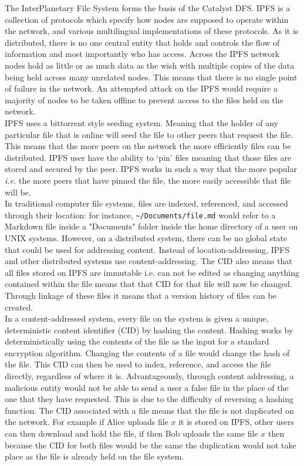 The InterPlanetary File System forms the basis of the Catalyst DFS. IPFS is a collection of protocols which specify how nodes are supposed to operate within the network, and various multilingual implementations of these protocols. As it is distributed, there is no one central entity that holds and controls the flow of information and most importantly who has access. Across the IPFS network nodes hold as little or as much data as the wish with multiple copies of the data being held across many unrelated nodes. This means that there is no single point of failure in the network. An attempted attack on the IPFS would require a majority of nodes to be taken offline to prevent access to the files held on the network.   \\

IPFS uses a bittorrent style seeding system. Meaning that the holder of any particular file that is online will seed the file to other peers that request the file. This means that the more peers on the network the more efficiently files can be distributed. IPFS user have the ability to `pin' files meaning that those files are stored and secured by the peer. IPFS works in such a way that the more popular \textit{i.e.} the more peers that have pinned the file, the more easily accessible that file will be.   \\

In traditional computer file systems, files are indexed, referenced, and accessed through their location: for instance, \verb`~/Documents/file.md` would refer to a Markdown file inside a "Documents" folder inside the home directory of a user on UNIX systems. However, on a distributed system, there can be no global state that could be used for addressing content. Instead of location-addressing, IPFS and other distributed systems use content-addressing. The CID also means that all files stored on IPFS are immutable i.e. can not be edited as changing anything contained within the file means that that CID for that file will now be changed. Through linkage of these files it means that a version history of files can be created. \\

In a content-addressed system, every file on the system is given a unique, deterministic content identifier (CID) by hashing the content. Hashing works by deterministically using the contents of the file as the input for a standard encryption algorithm. Changing the contents of a file would change the hash of the file. This CID can then be used to index, reference, and access the file directly, regardless of where it is. Advantageously, through content addressing, a malicious entity would not be able to send a user a false file in the place of the one that they have requested. This is due to the difficulty of reversing a hashing function. The CID associated with a file means that the file is not duplicated on the network. For example if Alice uploads file $x$ it is stored on IPFS, other users can then download and hold the file, if then Bob uploads the same file $x$ then because the CID for both files would be the same the duplication would not take place as the file is already held on the file system.  \\

